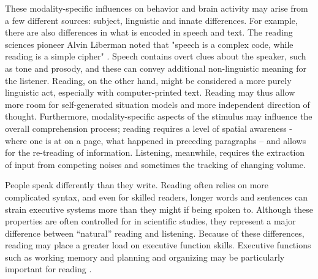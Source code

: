 These modality-specific influences on behavior and brain activity may arise from a few different sources: subject, linguistic and innate differences. For example, there are also differences in what is encoded in speech and text. The reading sciences pioneer Alvin Liberman noted that "speech is a complex code, while reading is a simple cipher" \cite{Mattingly1972}. Speech contains overt clues about the speaker, such as tone and prosody, and these can convey additional non-linguistic meaning for the listener. Reading, on the other hand, might be considered a more purely linguistic act, especially with computer-printed text. Reading may thus allow more room for self-generated situation models and more independent direction of thought. Furthermore, modality-specific aspects of the stimulus may influence the overall comprehension process; reading requires a level of spatial awareness -where one is at on a page, what happened in preceding paragraphs – and allows for the re-treading of information. Listening, meanwhile, requires the extraction of input from competing noises and sometimes the tracking of changing volume. 

People speak differently than they write. Reading often relies on more complicated syntax, and even for skilled readers, longer words and sentences can strain executive systems more than they might if being spoken to. Although these properties are often controlled for in scientific studies, they represent a major difference between “natural” reading and listening. Because of these differences, reading may place a greater load on executive function skills. Executive functions such as working memory and planning and organizing may be particularly important for reading \citep{Cain}.  

\begin{table}
	\renewcommand{\tabcolsep}{0.09cm}
	\centering
	
	\caption[Summary of findings for Study 1.]{}
	\label{table:ch2-results}
\end{table}

